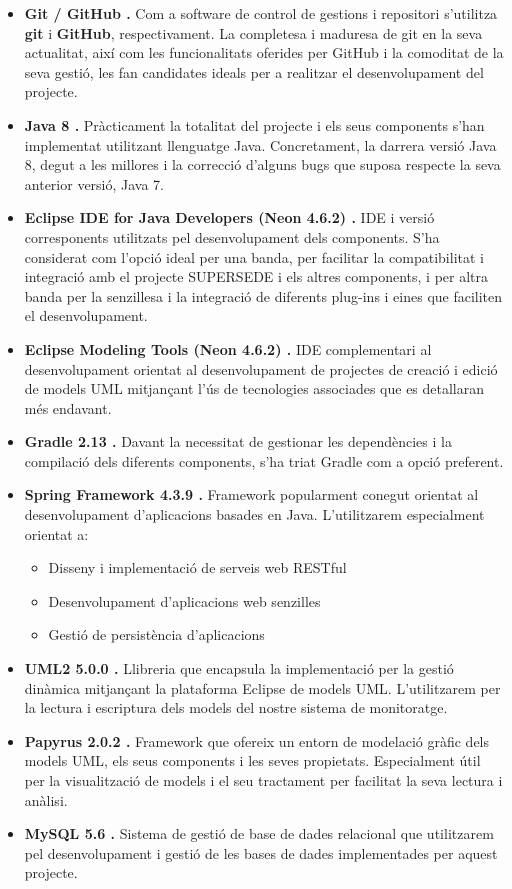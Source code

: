 \begin{itemize}
\item \textbf{Git / GitHub \cite{github}.} Com a software de control de gestions i repositori s'utilitza \textbf{git} i \textbf{GitHub}, respectivament. La completesa i maduresa de git en la seva actualitat, així com les funcionalitats oferides per GitHub i la comoditat de la seva gestió, les fan candidates ideals per a realitzar el desenvolupament del projecte.
\item \textbf{Java 8 \cite{java}.} Pràcticament la totalitat del projecte i els seus components s'han implementat utilitzant llenguatge Java. Concretament, la darrera versió Java 8, degut a les millores i la correcció d'alguns bugs que suposa respecte la seva anterior versió, Java 7.
\item \textbf{Eclipse IDE for Java Developers (Neon 4.6.2) \cite{eclipse}.} IDE i versió corresponents utilitzats pel desenvolupament dels components. S'ha considerat com l'opció ideal per una banda, per facilitar la compatibilitat i integració amb el projecte SUPERSEDE i els altres components, i per altra banda per la senzillesa i la integració de diferents plug-ins i eines que faciliten el desenvolupament. 
\item \textbf{Eclipse Modeling Tools (Neon 4.6.2) \cite{emt}.}  IDE complementari al desenvolupament orientat al desenvolupament de projectes de creació i edició de models UML mitjançant l'ús de tecnologies associades que es detallaran més endavant. 
\item \textbf{Gradle 2.13 \cite{gradle}.} Davant la necessitat de gestionar les dependències i la compilació dels diferents components, s'ha triat Gradle com a opció preferent.
\item \textbf{Spring Framework 4.3.9 \cite{spring}.} Framework popularment conegut orientat al desenvolupament d'aplicacions basades en Java. L'utilitzarem especialment orientat a:
\begin{itemize}
\item Disseny i implementació de serveis web RESTful
\item Desenvolupament d'aplicacions web senzilles
\item Gestió de persistència d'aplicacions
\end{itemize}
\item \textbf{UML2 5.0.0 \cite{uml}.} Llibreria que encapsula la implementació per la gestió dinàmica mitjançant la plataforma Eclipse de models UML. L'utilitzarem per la lectura i escriptura dels models del nostre sistema de monitoratge.
\item \textbf{Papyrus 2.0.2 \cite{papyrus}.} Framework que ofereix un entorn de modelació gràfic dels models UML, els seus components i les seves propietats. Especialment útil per la visualització de models i el seu tractament per facilitat la seva lectura i anàlisi.
\item \textbf{MySQL 5.6 \cite{sql}.} Sistema de gestió de base de dades relacional que utilitzarem pel desenvolupament i gestió de les bases de dades implementades per aquest projecte.
\end{itemize}

